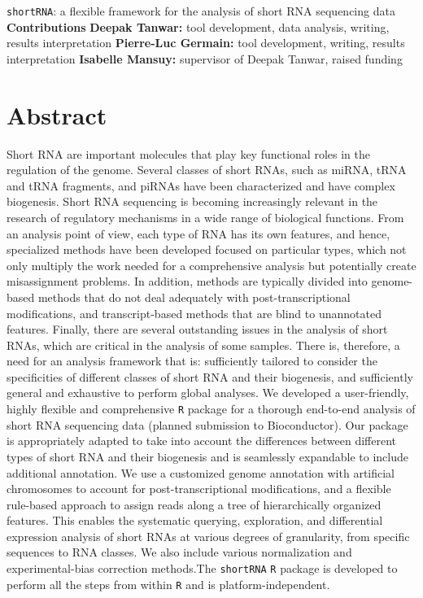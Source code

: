 \documentclass[12pt,twoside]{reedthesis}
\begin{document}
\begingroup\LARGE

\texttt{shortRNA}: a flexible framework for the analysis of short RNA
sequencing data\newline \begingroup\Large \normalsize\newline\newline
\begingroup\large
\textbf{Contributions}\begingroup\large \normalsize\newline
\textbf{Deepak Tanwar:} tool development, data analysis, writing, results interpretation\newline
\textbf{Pierre-Luc Germain:} tool development, writing, results interpretation\newline
\textbf{Isabelle Mansuy:} supervisor of Deepak Tanwar, raised funding\newline
\begingroup\normalsize

\hypertarget{abstract-2}{%
\section{Abstract}\label{abstract-2}}

Short RNA are important molecules that play key functional roles in the
regulation of the genome. Several classes of short RNAs, such as miRNA,
tRNA and tRNA fragments, and piRNAs have been characterized and have
complex biogenesis. Short RNA sequencing is becoming increasingly
relevant in the research of regulatory mechanisms in a wide range of
biological functions. From an analysis point of view, each type of RNA
has its own features, and hence, specialized methods have been developed
focused on particular types, which not only multiply the work needed for
a comprehensive analysis but potentially create misassignment problems.
In addition, methods are typically divided into genome-based methods
that do not deal adequately with post-transcriptional modifications, and
transcript-based methods that are blind to unannotated features.
Finally, there are several outstanding issues in the analysis of short
RNAs, which are critical in the analysis of some samples. There is,
therefore, a need for an analysis framework that is: sufficiently
tailored to consider the specificities of different classes of short RNA
and their biogenesis, and sufficiently general and exhaustive to perform
global analyses. We developed a user-friendly, highly flexible and
comprehensive \texttt{R} package for a thorough end-to-end analysis of short
RNA sequencing data (planned submission to Bioconductor). Our package is
appropriately adapted to take into account the differences between
different types of short RNA and their biogenesis and is seamlessly
expandable to include additional annotation. We use a customized genome
annotation with artificial chromosomes to account for
post-transcriptional modifications, and a flexible rule-based approach
to assign reads along a tree of hierarchically organized features. This
enables the systematic querying, exploration, and differential
expression analysis of short RNAs at various degrees of granularity,
from specific sequences to RNA classes. We also include various
normalization and experimental-bias correction methods.The \texttt{shortRNA}
\texttt{R} package is developed to perform all the steps from within \texttt{R} and is
platform-independent.
\end{document}
